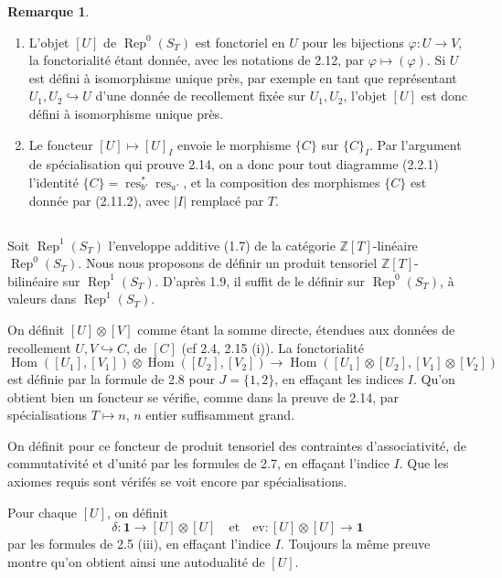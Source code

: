 \documentclass[11pt,a4paper]{article}
\theoremstyle{plain}
\theoremstyle{definition}
\newtheorem{remark}[theorem]{Remarque}
\DeclareMathOperator{\Hom}{Hom}
\DeclareMathOperator{\Rep}{Rep}
\DeclareMathOperator{\res}{res}
\newcommand{\Z}{\mathbb{Z}}
\newcommand{\inj}{\hookrightarrow}
\newcommand{\ev}{\mathrm{ev}}
\begin{document}
\begin{remark}
\begin{enumerate}[label=(\roman*)]
\item L'objet $[U]$ de $\Rep^0(S_T)$ est fonctoriel en $U$ pour les bijections $\varphi : U \to V$, la fonctorialit\'e \'etant donn\'ee, avec les notations de 2.12, par $\varphi \mapsto (\varphi)$. Si $U$ est d\'efini \`a isomorphisme unique pr\`es, par exemple en tant que repr\'esentant $U_1, U_2 \inj U$ d'une donn\'ee de recollement fix\'ee sur $U_1, U_2$, l'objet $[U]$ est donc d\'efini \`a isomorphisme unique pr\`es.

\item Le foncteur $[U] \mapsto [U]_I$ envoie le morphisme $\{C\}$ sur $\{C\}_I$. Par l'argument de sp\'ecialisation qui prouve 2.14, on a donc pour tout diagramme (2.2.1) l'identit\'e $\{C\} = \res^*_{b'} \res_{a'}$, et la composition des morphismes $\{C\}$ est donn\'ee par (2.11.2), avec $|I|$ remplac\'e par $T$.
\end{enumerate}
\end{remark}

\subsection{}
Soit $\Rep^1(S_T)$ l'enveloppe additive (1.7) de la cat\'egorie $\Z[T]$-lin\'eaire $\Rep^0(S_T)$. Nous nous proposons de d\'efinir un produit tensoriel $\Z[T]$-bilin\'eaire sur $\Rep^1(S_T)$. D'apr\`es 1.9, il suffit de le d\'efinir sur $\Rep^0(S_T)$, \`a valeurs dans $\Rep^1(S_T)$.

On d\'efinit $[U] \otimes [V]$ comme \'etant la somme directe, \'etendues aux donn\'ees de recollement $U, V \inj C$, de $[C]$ (cf 2.4, 2.15 (i)). La fonctorialit\'e
\[
\Hom([U_1], [V_1]) \otimes \Hom([U_2], [V_2]) \to \Hom([U_1] \otimes [U_2], [V_1] \otimes [V_2])
\]
est d\'efinie par la formule de 2.8 pour $J = \{1, 2\}$, en effa\c{c}ant les indices $I$. Qu'on obtient bien un foncteur se v\'erifie, comme dans la preuve de 2.14, par sp\'ecialisations $T \mapsto n$, $n$ entier suffisamment grand.

On d\'efinit pour ce foncteur de produit tensoriel des contraintes d'associativit\'e, de commutativit\'e et d'unit\'e par les formules de 2.7, en effa\c{c}ant l'indice $I$. Que les axiomes requis sont v\'erif\'es se voit encore par sp\'ecialisations.

Pour chaque $[U]$, on d\'efinit
\begin{equation}
\delta : \mathbf{1} \to [U] \otimes [U] \quad \text{et} \quad \ev : [U] \otimes [U] \to \mathbf{1} \tag{2.16.1}
\end{equation}
par les formules de 2.5 (iii), en effa\c{c}ant l'indice $I$. Toujours la m\^eme preuve montre qu'on obtient ainsi une autodualit\'e de $[U]$.
\end{document}
